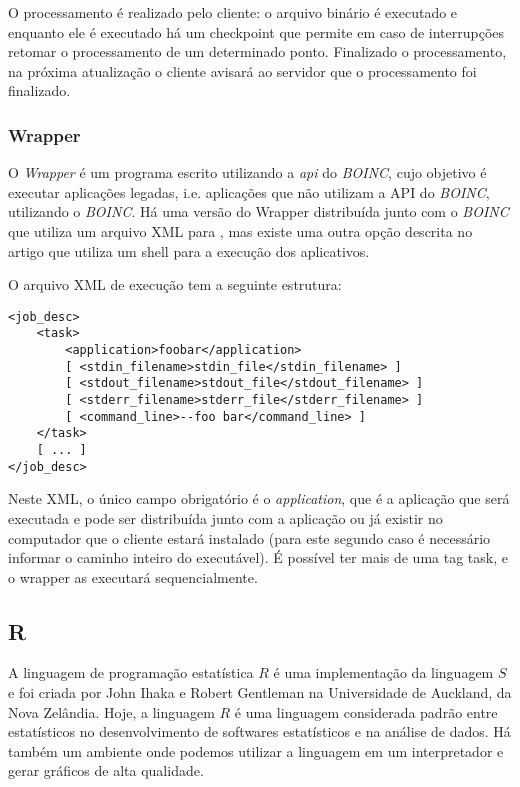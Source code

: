 O processamento é realizado pelo cliente: o arquivo binário é executado e enquanto ele é executado há um checkpoint
que permite em caso de interrupções retomar o processamento de um determinado ponto. Finalizado o processamento, 
na próxima atualização o cliente avisará ao servidor que o processamento foi finalizado. 

\subsubsection{Wrapper}

O \emph{Wrapper} é um programa escrito utilizando a \emph{api} do \emph{BOINC}, cujo objetivo é executar aplicações legadas, 
i.e. aplicações que não utilizam a API do \emph{BOINC}, utilizando o \textit{BOINC}. Há uma versão do Wrapper distribuída junto com o 
\textit{BOINC} que utiliza um arquivo XML para , mas existe uma outra opção descrita no artigo %
que utiliza um shell para a execução dos aplicativos.

O arquivo XML de execução tem a seguinte estrutura:

\begin{verbatim}
<job_desc>
    <task>
        <application>foobar</application>
        [ <stdin_filename>stdin_file</stdin_filename> ]
        [ <stdout_filename>stdout_file</stdout_filename> ]
        [ <stderr_filename>stderr_file</stderr_filename> ]
        [ <command_line>--foo bar</command_line> ]
    </task>
    [ ... ]
</job_desc>
\end{verbatim}

Neste XML, o único campo obrigatório é o \emph{application}, que é a aplicação
que será executada e pode ser distribuída junto com a aplicação ou já existir no 
computador que o cliente estará instalado (para este segundo caso é necessário
informar o caminho inteiro do executável). É possível ter mais de uma tag
task, e o wrapper as executará sequencialmente.

\subsection{R}


A linguagem de programação estatística $R$ é uma implementação da linguagem $S$ e foi criada por John Ihaka e Robert
Gentleman na Universidade de Auckland, da Nova Zelândia. Hoje, a linguagem $R$ é uma linguagem considerada padrão
entre estatísticos no desenvolvimento de softwares estatísticos e na análise de dados. Há também um ambiente 
onde podemos utilizar a linguagem em um interpretador e gerar gráficos de alta qualidade. 

